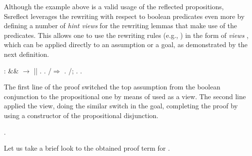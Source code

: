 Although the example above is a valid usage of the reflected
propositions, Ssreflect leverages the rewriting with respect to
boolean predicates even more by defining a number of \textit{hint views} for
the rewriting lemmas that make use of the  predicates. This
allows one to use the rewriting rules (e.g., ) in the form of
\textit{views} , which can be applied directly to an
assumption or a goal, as demonstrated by the next definition.


\begin{coqdoccode}
\coqdocemptyline
\coqdocnoindent
{}   :  \&\&  \ensuremath{\rightarrow}  || .\coqdoceol
\coqdocnoindent
{}.\coqdoceol
\coqdocnoindent
{}/\ensuremath{\Rightarrow} .\coqdoceol
\coqdocnoindent
{} /; .\coqdoceol
\coqdocnoindent
{}.\coqdoceol
\coqdocemptyline
\end{coqdoccode}


The first line of the proof switched the top assumption from the
boolean conjunction to the propositional one by means of  used
as a view. The second line applied the  view, doing the similar
switch in the goal, completing the proof by using a constructor of the
propositional disjunction.


\begin{coqdoccode}
\coqdocemptyline
\coqdocnoindent
{} .\coqdoceol
\coqdocemptyline
\end{coqdoccode}


Let us take a brief look to the obtained proof term for .


